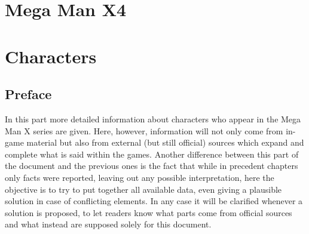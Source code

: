 \documentclass[openany]{report}
\begin{document}
\part{Mega Man X4}
\label{cha:X4}

\part{Characters}
\chapter*{Preface}

	In this part more detailed information about characters who appear in the Mega Man X series are given. Here, however, information will not only come from in-game material but also from external (but still official) sources which expand and complete what is said within the games. Another difference between this part of the document and the previous ones is the fact that while in precedent chapters only facts were reported, leaving out any possible interpretation, here the objective is to try to put together all available data, even giving a plausible solution in case of conflicting elements. In any case it will be clarified whenever a solution is proposed, to let readers know what parts come from official sources and what instead are supposed solely for this document.
	
\end{document}
